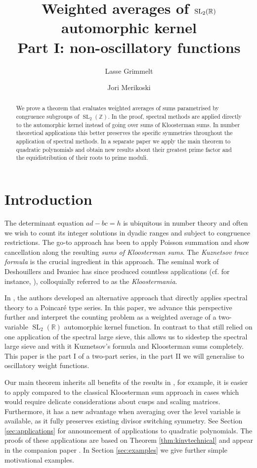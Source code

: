 \documentclass[12pt]{amsart}
\title{Weighted averages of $\SL_2(\R)$ automorphic kernel \\ Part I: non-oscillatory functions}
\author{Lasse Grimmelt}
\author{Jori Merikoski}
\date{}
\theoremstyle{definition}
\theoremstyle{remark}
\numberwithin{equation}{section}
\newcommand{\R}{{\mathbb R}}
\newcommand{\Z}{{\mathbb Z}}
\newcommand{\1}{{\mathbf 1}}
\newcommand{\SL}{\operatorname{SL}}
\begin{document}
\begin{abstract}
We prove a theorem that evaluates weighted averages of sums parametrised by congruence subgroups of $\SL_2(\Z)$. In the proof, spectral methods are applied directly to the automorphic kernel instead of going over sums of Kloosterman sums. In number theoretical applications this better preserves the specific symmetries throughout the application of spectral methods.  In a separate paper we apply the main theorem to quadratic polynomials and obtain new results about their greatest prime factor and the equidistribution of their roots to prime moduli. 
\end{abstract}

\maketitle


\tableofcontents
\section{Introduction}



The determinant equation $ad-bc=h$ is ubiquitous in number theory and often we wish to count its integer solutions in dyadic ranges and subject to congruence restrictions. The go-to approach has been to apply Poisson summation and show cancellation along the resulting  \emph{sums of Kloosterman sums}. The \emph{Kuznetsov trace formula} is the crucial ingredient in this approach. The seminal work of Deshouillers and Iwaniec \cite{deshoullieriwaniec} has since produced countless applications (cf. for instance, \cite{BFI,motohashi,petrowyoung,young}), colloquially referred to as the \emph{Kloostermania}. 

In \cite{GM}, the authors developed an alternative approach that directly applies spectral theory to a Poincaré type series. In this paper, we advance this perspective further and interpret the counting problem as a weighted average of a two-variable $\SL_2(\R)$ automorphic kernel function. In contrast to \cite{GM} that still relied on one application of the spectral large sieve, this allows us to sidestep the spectral large sieve and with it Kuznetsov's formula and Kloosterman sums completely. This paper is the part I of a two-part series, in the part II we will generalise to oscillatory weight functions.

Our main theorem inherits all benefits of the results in \cite{GM}, for example, it is easier to apply compared to the classical Kloosterman sum approach in cases which would require delicate considerations about cusps and scaling matrices. Furthermore, it has a new advantage when averaging over the level variable is available, as it fully preserves existing divisor switching symmetry. See Section \ref{sec:applications} for announcement of applications to quadratic polynomials. The proofs of these applications are based on Theorem \ref{thm:kinvtechnical} and appear in the companion paper \cite{GMquadratic}. In Section \ref{sec:examples} we give further simple motivational examples.
\end{document}
